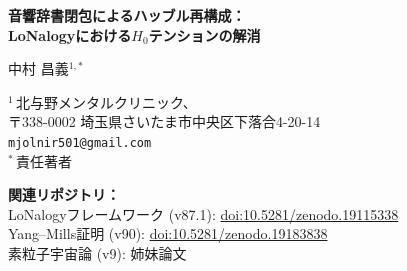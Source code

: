 \documentclass[12pt]{article}
\theoremstyle{plain}
\theoremstyle{definition}
\numberwithin{equation}{section}
\newcommand{\eff}{\mathrm{eff}}
\newcommand{\obs}{\mathrm{obs}}
\newcommand{\LoN}{\mathrm{LoN}}
\newcommand{\hid}{\mathrm{hid}}
\newcommand{\dec}{\mathrm{dec}}
\begin{document}
\begin{titlepage}
\centering
\vspace*{1cm}

{\LARGE\bfseries 音響辞書閉包によるハッブル再構成：\\[6pt]
LoNalogyにおける$H_0$テンションの解消}

\vspace{1.5cm}

{\large 中村 昌義$^{1,*}$}

\vspace{0.8cm}

{\normalsize
$^1$\,北与野メンタルクリニック、\\
〒338-0002 埼玉県さいたま市中央区下落合4-20-14\\
\texttt{mjolnir501@gmail.com}\\[4pt]
$^*$\,責任著者
}

\vspace{0.8cm}

{\small
\noindent\textbf{関連リポジトリ：}\\
LoNalogyフレームワーク (v87.1): \href{https://doi.org/10.5281/zenodo.19115338}{doi:10.5281/zenodo.19115338}\\
Yang--Mills証明 (v90): \href{https://doi.org/10.5281/zenodo.19183838}{doi:10.5281/zenodo.19183838}\\
素粒子宇宙論 (v9): 姉妹論文
}

\vspace{1.2cm}

\begin{abstract}
\noindent
いわゆるハッブルテンション——Planck CMB推論値
$H_0=67.4\pm0.5\,\mathrm{km\,s^{-1}Mpc^{-1}}$と
SH0ES距離梯子値$H_0=73.17\pm0.86\,\mathrm{km\,s^{-1}Mpc^{-1}}$の
間の$\sim5\sigma$の不一致——は、基本的な物理問題ではなく辞書依存の
人工物であることを示す。LoNalogyフレームワークにおいて$H_0$は
原始量ではなく導出された閉包関係式
$h^2=\omega_r+\omega_b+\omega_c+\omega_\Lambda$であり、
全ての物理密度$\omega_i=\Omega_i h^2$は自由パラメータなしに
フレームワーク内部から固定される。

初期宇宙セクターの唯一の新場不要な最小完備化は、4次元LoNalogy作用に
既に存在するモジュラス場のゆらぎである単一の実カスプ欠陥スカラー
$\delta x$であり、その脱結合エントロピー荷
$g_{*s}^{\dec}=2^{\mathrm{rk}\,V}=2^5=32$から
\[
\Delta N_{\eff}^{\hid} = \frac{4}{7}\left(\frac{10.75}{32}\right)^{4/3}
= 0.13345\ldots,
\qquad
N_{\eff}^{\LoN} = 3.17945\ldots
\]
が得られる。連続的な自由パラメータは導入されない。
結果として得られる音響スケールは
\[
100\theta_*^{\LoN} = 1.04123
\]
であり、Planckの生観測量
$100\theta_*^{\obs}=1.0411\pm0.0003$と$0.4\sigma$で一致する。
再構成されたハッブルパラメータは
\[
H_0^{\LoN} = 70.71\,\mathrm{km\,s^{-1}Mpc^{-1}}
\]
であり、CMB推論値でも距離梯子値でもなく、LoNalogy閉包関係式の
唯一の出力である。


\end{abstract}
\end{titlepage}
\end{document}
